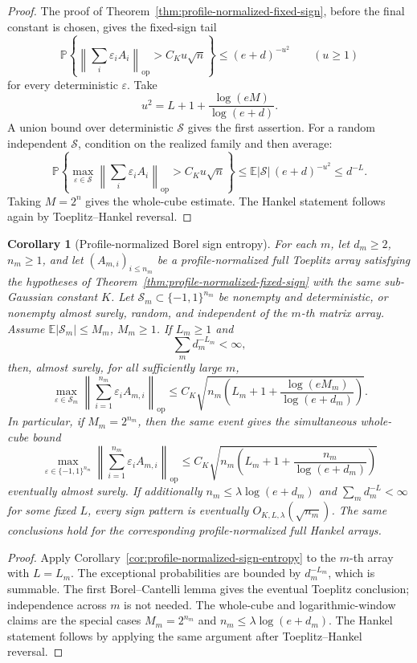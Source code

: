 \documentclass[11pt]{amsart}
\numberwithin{equation}{section}
\newtheorem{corollary}[theorem]{Corollary}
\theoremstyle{definition}
\theoremstyle{remark}
\newcommand{\op}{\mathrm{op}}
\newcommand{\Prob}{\mathbb P}
\newcommand{\Exp}{\mathbb E}
\newcommand{\norm}[1]{\left\lVert #1\right\rVert}
\newcommand{\abs}[1]{\left\lvert #1\right\rvert}
\newcommand{\eps}{\varepsilon}
\begin{document}
\begin{proof}
The proof of Theorem~\ref{thm:profile-normalized-fixed-sign}, before the final
constant is chosen, gives the fixed-sign tail
\[
  \Prob\left\{
  \norm{\sum_i\eps_iA_i}_{\op}>C_Ku\sqrt n
  \right\}
  \le (e+d)^{-u^2}
  \qquad(u\ge1)
\]
for every deterministic \(\eps\).  Take
\[
  u^2=L+1+\frac{\log(eM)}{\log(e+d)}.
\]
A union bound over deterministic \(\mathcal S\) gives the first assertion.
For a random independent \(\mathcal S\), condition on the realized family and
then average:
\[
  \Prob\left\{\max_{\eps\in\mathcal S}
  \norm{\sum_i\eps_iA_i}_{\op}>C_Ku\sqrt n\right\}
  \le
  \Exp\abs{\mathcal S}\,(e+d)^{-u^2}
  \le d^{-L}.
\]
Taking \(M=2^n\) gives the whole-cube estimate.  The Hankel statement follows
again by Toeplitz--Hankel reversal.
\end{proof}

\begin{corollary}[Profile-normalized Borel sign entropy]
\label{cor:profile-normalized-sign-entropy-borel}
For each \(m\), let \(d_m\ge2\), \(n_m\ge1\), and let
\((A_{m,i})_{i\le n_m}\) be a profile-normalized full Toeplitz array satisfying
the hypotheses of Theorem~\ref{thm:profile-normalized-fixed-sign} with the same
sub-Gaussian constant \(K\).  Let \(\mathcal S_m\subset\{-1,1\}^{n_m}\) be
nonempty and deterministic, or nonempty almost surely, random, and independent
of the \(m\)-th matrix array.  Assume \(\Exp\abs{\mathcal S_m}\le M_m\),
\(M_m\ge1\).  If \(L_m\ge1\) and
\[
  \sum_m d_m^{-L_m}<\infty ,
\]
then, almost surely, for all sufficiently large \(m\),
\[
  \max_{\eps\in\mathcal S_m}
  \norm{\sum_{i=1}^{n_m}\eps_iA_{m,i}}_{\op}
  \le
  C_K\sqrt{n_m\left(L_m+1+
  \frac{\log(eM_m)}{\log(e+d_m)}\right)} .
\]
In particular, if \(M_m=2^{n_m}\), then the same event gives the simultaneous
whole-cube bound
\[
  \max_{\eps\in\{-1,1\}^{n_m}}
  \norm{\sum_{i=1}^{n_m}\eps_iA_{m,i}}_{\op}
  \le
  C_K\sqrt{n_m\left(L_m+1+\frac{n_m}{\log(e+d_m)}\right)}
\]
eventually almost surely.  If additionally \(n_m\le\lambda\log(e+d_m)\) and
\(\sum_m d_m^{-L}<\infty\) for some fixed \(L\), every sign pattern is
eventually \(O_{K,L,\lambda}(\sqrt{n_m})\).  The same conclusions hold for the
corresponding profile-normalized full Hankel arrays.
\end{corollary}

\begin{proof}
Apply Corollary~\ref{cor:profile-normalized-sign-entropy} to the \(m\)-th array
with \(L=L_m\).  The exceptional probabilities are bounded by \(d_m^{-L_m}\),
which is summable.  The first Borel--Cantelli lemma gives the eventual Toeplitz
conclusion; independence across \(m\) is not needed.  The whole-cube and
logarithmic-window claims are the special cases \(M_m=2^{n_m}\) and
\(n_m\le\lambda\log(e+d_m)\).  The Hankel statement follows by applying the
same argument after Toeplitz--Hankel reversal.
\end{proof}
\end{document}

